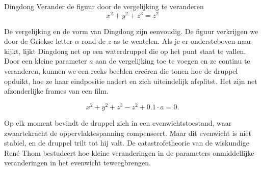 \begin{surferPage}{Dingdong}
Verander de figuur door de vergelijking te veranderen\\

\smallskip
\[x^2	+ y^2	+ z^3	= z^2\]

\singlespacing
De vergelijking en de vorm van Dingdong zijn eenvoudig. De figuur verkrijgen we door de Griekse letter $\alpha$ rond de $z$-as te wentelen. Als je er ondersteboven naar kijkt, lijkt Dingdong net op een waterdruppel die op het punt staat te vallen.
\newline
Door een kleine parameter $a$ aan de vergelijking toe te voegen en ze continu te veranderen, kunnen we een reeks beelden cre\"eren die tonen hoe de druppel opduikt, hoe ze haar eindpositie nadert en zich uiteindelijk afsplitst. Het zijn net afzonderlijke frames van een film.

\[x^2	+ y^2	+ z^3	-z^2+0.1\cdot a=0.\]

Op elk moment bevindt de druppel zich in een evenwichtstoestand, waar zwaartekracht de oppervlaktespanning compenseert. Maar dit evenwicht is niet stabiel, en de druppel trilt tot hij valt. De catastrofetheorie van de wiskundige Ren\'e Thom bestudeert hoe kleine veranderingen in de parameters onmiddellijke veranderingen in het evenwicht teweegbrengen.
\end{surferPage}

